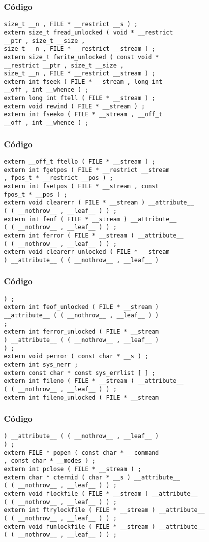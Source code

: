 \documentclass{beamer}
\begin{document}
\begin{frame}[fragile]
\frametitle{C\'odigo}
\begin{verbatim}
size_t __n , FILE * __restrict __s ) ; 
extern size_t fread_unlocked ( void * __restrict 
__ptr , size_t __size , 
size_t __n , FILE * __restrict __stream ) ; 
extern size_t fwrite_unlocked ( const void * 
__restrict __ptr , size_t __size , 
size_t __n , FILE * __restrict __stream ) ; 
extern int fseek ( FILE * __stream , long int 
__off , int __whence ) ; 
extern long int ftell ( FILE * __stream ) ; 
extern void rewind ( FILE * __stream ) ; 
extern int fseeko ( FILE * __stream , __off_t 
__off , int __whence ) ; 
\end{verbatim}
\end{frame}
\begin{frame}[fragile]
\frametitle{C\'odigo}
\begin{verbatim}
extern __off_t ftello ( FILE * __stream ) ; 
extern int fgetpos ( FILE * __restrict __stream 
, fpos_t * __restrict __pos ) ; 
extern int fsetpos ( FILE * __stream , const 
fpos_t * __pos ) ; 
extern void clearerr ( FILE * __stream ) __attribute__ 
( ( __nothrow__ , __leaf__ ) ) ; 
extern int feof ( FILE * __stream ) __attribute__ 
( ( __nothrow__ , __leaf__ ) ) ; 
extern int ferror ( FILE * __stream ) __attribute__ 
( ( __nothrow__ , __leaf__ ) ) ; 
extern void clearerr_unlocked ( FILE * __stream 
) __attribute__ ( ( __nothrow__ , __leaf__ ) 
\end{verbatim}
\end{frame}
\begin{frame}[fragile]
\frametitle{C\'odigo}
\begin{verbatim}
) ; 
extern int feof_unlocked ( FILE * __stream ) 
__attribute__ ( ( __nothrow__ , __leaf__ ) ) 
; 
extern int ferror_unlocked ( FILE * __stream 
) __attribute__ ( ( __nothrow__ , __leaf__ ) 
) ; 
extern void perror ( const char * __s ) ; 
extern int sys_nerr ; 
extern const char * const sys_errlist [ ] ; 
extern int fileno ( FILE * __stream ) __attribute__ 
( ( __nothrow__ , __leaf__ ) ) ; 
extern int fileno_unlocked ( FILE * __stream 
\end{verbatim}
\end{frame}
\begin{frame}[fragile]
\frametitle{C\'odigo}
\begin{verbatim}
) __attribute__ ( ( __nothrow__ , __leaf__ ) 
) ; 
extern FILE * popen ( const char * __command 
, const char * __modes ) ; 
extern int pclose ( FILE * __stream ) ; 
extern char * ctermid ( char * __s ) __attribute__ 
( ( __nothrow__ , __leaf__ ) ) ; 
extern void flockfile ( FILE * __stream ) __attribute__ 
( ( __nothrow__ , __leaf__ ) ) ; 
extern int ftrylockfile ( FILE * __stream ) __attribute__ 
( ( __nothrow__ , __leaf__ ) ) ; 
extern void funlockfile ( FILE * __stream ) __attribute__ 
( ( __nothrow__ , __leaf__ ) ) ; \end{verbatim}
\end{frame}
\end{document}
